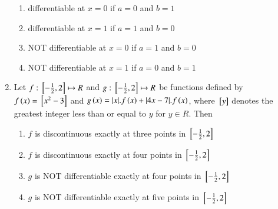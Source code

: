 \documentclass[journal,12pt,twocolumn]{IEEEtran}
\theoremstyle{remark}
\begin{document}
\begin{enumerate}
    \hfill 
    {}
    
    \begin{enumerate}[label=(\alph*)]
        
        \item differentiable at $x=0$ if $a=0$ and $b=1$
        \item differentiable at $x=1$ if $a=1$ and $b=0$
        \item {NOT} differentiable at $x=0$ if $a=1$ and $b=0$
        \item {NOT} differentiable at $x=1$ if $a=0$ and $b=1$
    \end{enumerate}


    \item 
    {Let $f:{}\left[-\frac{1}{2}, 2\right]\mapsto R$ and $g:{}\left[-\frac{1}{2}, 2\right]\mapsto R$ be functions defined by $f\left(x\right)={}\left[x^2-3\right]$ and $g\left(x\right)=|x|.f\left(x\right)+|4x-7|.f\left(x\right)$, where ${}\left[y\right]$ denotes the greatest integer less than or equal to $y$ for $y\in R$. Then}   
        
    \hfill 
    {}
    
    \begin{enumerate}[label=(\alph*)]
        
        \item $f$ is discontinuous exactly at three points in ${}\left[-\frac{1}{2}, 2\right]$
        \item $f$ is discontinuous exactly at four points in ${}\left[-\frac{1}{2}, 2\right]$
        \item $g$ is NOT differentiable exactly at four points in ${}\left[-\frac{1}{2}, 2\right]$
        \item $g$ is NOT differentiable exactly at five points in ${}\left[-\frac{1}{2}, 2\right]$
    \end{enumerate}

\end{enumerate}
\end{document}
